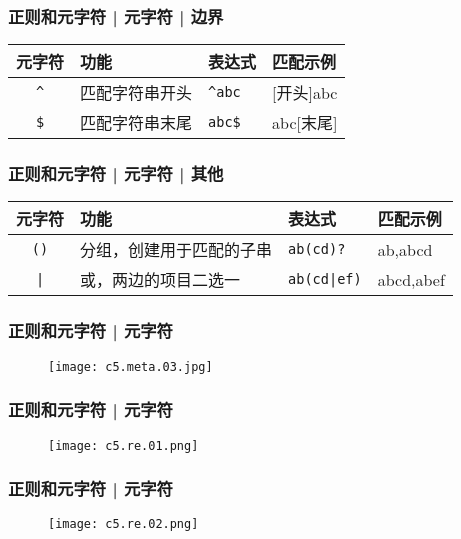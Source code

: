 \begin{frame}[fragile]
  \frametitle{正则和元字符 | 元字符 | \alert{边界}}
  \begin{table}
    \centering
    \begin{tabularx}{\textwidth}{cXll}
      \hline
      \rowcolor{blue!50}元字符 & 功能 & 表达式 & 匹配示例\\
      \hline
      \verb|^| & 匹配字符串开头 & \verb|^abc| & [开头]abc\\
      \verb|$| & 匹配字符串末尾 & \verb|abc$| & abc[末尾]\\
      \hline
    \end{tabularx}
  \end{table}
\end{frame}

\begin{frame}[fragile]
  \frametitle{正则和元字符 | 元字符 | \alert{其他}}
  \begin{table}
    \centering
    \begin{tabularx}{\textwidth}{cXll}
      \hline
      \rowcolor{blue!50}元字符 & 功能 & 表达式 & 匹配示例\\
      \hline
      \verb|()| & 分组，创建用于匹配的子串 & \verb|ab(cd)?| & ab,abcd\\
      \verb=|= & 或，两边的项目二选一 & \verb=ab(cd|ef)= & abcd,abef\\
      \hline
    \end{tabularx}
  \end{table}
\end{frame}

\begin{frame}
  \frametitle{正则和元字符 | 元字符}
  \begin{figure}
    \centering
    \texttt{[image: c5.meta.03.jpg]}
  \end{figure}
\end{frame}

\begin{frame}
  \frametitle{正则和元字符 | 元字符}
  \begin{figure}
    \centering
    \texttt{[image: c5.re.01.png]}
  \end{figure}
\end{frame}

\begin{frame}
  \frametitle{正则和元字符 | 元字符}
  \begin{figure}
    \centering
    \texttt{[image: c5.re.02.png]}
  \end{figure}
\end{frame}


